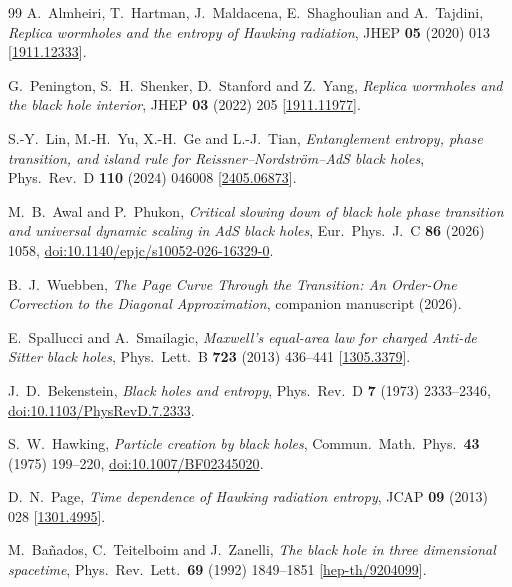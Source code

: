 \documentclass[11pt,letterpaper]{article}
\theoremstyle{plain}
\theoremstyle{definition}
\theoremstyle{remark}
\begin{document}
\begin{thebibliography}{99}
A.~Almheiri, T.~Hartman, J.~Maldacena, E.~Shaghoulian and A.~Tajdini,
\emph{Replica wormholes and the entropy of Hawking radiation},
JHEP \textbf{05} (2020) 013
[\href{https://arxiv.org/abs/1911.12333}{1911.12333}].

G.~Penington, S.~H.~Shenker, D.~Stanford and Z.~Yang,
\emph{Replica wormholes and the black hole interior},
JHEP \textbf{03} (2022) 205
[\href{https://arxiv.org/abs/1911.11977}{1911.11977}].

S.-Y.~Lin, M.-H.~Yu, X.-H.~Ge and L.-J.~Tian,
\emph{Entanglement entropy, phase transition, and island rule for Reissner--Nordstr\"om--AdS black holes},
Phys.\ Rev.\ D \textbf{110} (2024) 046008
[\href{https://arxiv.org/abs/2405.06873}{2405.06873}].

M.~B.~Awal and P.~Phukon, \emph{Critical slowing down of black hole phase transition and universal dynamic scaling in AdS black holes},
Eur.\ Phys.\ J.\ C \textbf{86} (2026) 1058,
\href{https://doi.org/10.1140/epjc/s10052-026-16329-0}{doi:10.1140/epjc/s10052-026-16329-0}.

B.~J.~Wuebben, \emph{The Page Curve Through the Transition: An Order-One Correction to the Diagonal Approximation},
companion manuscript (2026).

E.~Spallucci and A.~Smailagic, \emph{Maxwell's equal-area law for charged Anti-de Sitter black holes},
Phys.\ Lett.\ B \textbf{723} (2013) 436--441
[\href{https://arxiv.org/abs/1305.3379}{1305.3379}].

J.~D.~Bekenstein, \emph{Black holes and entropy},
Phys.\ Rev.\ D \textbf{7} (1973) 2333--2346,
\href{https://doi.org/10.1103/PhysRevD.7.2333}{doi:10.1103/PhysRevD.7.2333}.

S.~W.~Hawking, \emph{Particle creation by black holes},
Commun.\ Math.\ Phys.\ \textbf{43} (1975) 199--220,
\href{https://doi.org/10.1007/BF02345020}{doi:10.1007/BF02345020}.

D.~N.~Page, \emph{Time dependence of Hawking radiation entropy},
JCAP \textbf{09} (2013) 028
[\href{https://arxiv.org/abs/1301.4995}{1301.4995}].

M.~Ba\~nados, C.~Teitelboim and J.~Zanelli,
\emph{The black hole in three dimensional spacetime},
Phys.\ Rev.\ Lett.\ \textbf{69} (1992) 1849--1851
[\href{https://arxiv.org/abs/hep-th/9204099}{hep-th/9204099}].


\end{thebibliography}
\end{document}
